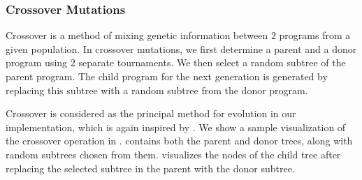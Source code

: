 \subsubsection{Crossover Mutations}
\label{subsec:crossover}
Crossover is a method of mixing genetic information between $2$ programs from a given population. In crossover mutations, we first determine a parent and a donor program using $2$ separate tournaments. We then select a random subtree of the parent program. The child program for the next generation is generated by replacing this subtree with a random subtree from the donor program. 

Crossover is considered as the principal method for evolution in our implementation, which is again inspired by \citet{gplearn}. We show a sample visualization of the crossover operation in .  contains both the parent and donor trees, along with random subtrees chosen from them.  visualizes the nodes of the child tree after replacing the selected subtree in the parent with the donor subtree. 

